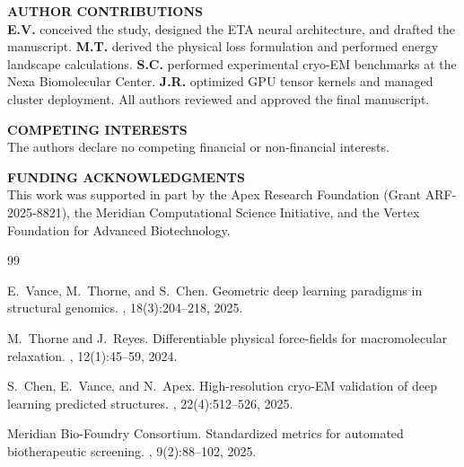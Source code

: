 \documentclass[10pt,a4paper]{scrartcl}
\begin{document}
\vspace{6mm}
\begin{tcolorbox}[colback=lightbg, colframe=bordergray, arc=4pt, boxrule=0.6pt, left=10pt, right=10pt, top=8pt, bottom=8pt]
  {\sffamily\small\bfseries\color{journalblue} AUTHOR CONTRIBUTIONS}\\[1mm]
  {\sffamily\scriptsize\color{darkslate}
  \textbf{E.V.} conceived the study, designed the ETA neural architecture, and drafted the manuscript. \textbf{M.T.} derived the physical loss formulation and performed energy landscape calculations. \textbf{S.C.} performed experimental cryo-EM benchmarks at the Nexa Biomolecular Center. \textbf{J.R.} optimized GPU tensor kernels and managed cluster deployment. All authors reviewed and approved the final manuscript.
  }

  \vspace{2mm}
  {\sffamily\small\bfseries\color{journalblue} COMPETING INTERESTS}\\[1mm]
  {\sffamily\scriptsize\color{darkslate}
  The authors declare no competing financial or non-financial interests.
  }

  \vspace{2mm}
  {\sffamily\small\bfseries\color{journalblue} FUNDING ACKNOWLEDGMENTS}\\[1mm]
  {\sffamily\scriptsize\color{darkslate}
  This work was supported in part by the Apex Research Foundation (Grant ARF-2025-8821), the Meridian Computational Science Initiative, and the Vertex Foundation for Advanced Biotechnology.
  }
\end{tcolorbox}

\vspace{4mm}
\begin{thebibliography}{99}
\small
\setlength{\itemsep}{2pt}
\setlength{\parsep}{0pt}

E.~Vance, M.~Thorne, and S.~Chen.
\newblock Geometric deep learning paradigms in structural genomics.
, 18(3):204--218, 2025.

M.~Thorne and J.~Reyes.
\newblock Differentiable physical force-fields for macromolecular relaxation.
, 12(1):45--59, 2024.

S.~Chen, E.~Vance, and N.~Apex.
\newblock High-resolution cryo-EM validation of deep learning predicted structures.
, 22(4):512--526, 2025.

Meridian Bio-Foundry Consortium.
\newblock Standardized metrics for automated biotherapeutic screening.
, 9(2):88--102, 2025.

\end{thebibliography}
\end{document}
